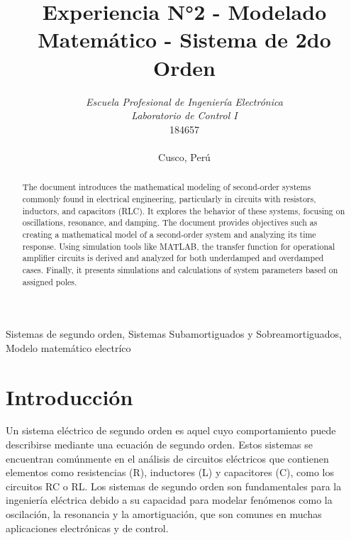 \documentclass[conference]{IEEEtran}
\begin{document}
	
	\title{Experiencia N°2 - Modelado Matemático - Sistema de 2do Orden}
	\author{	
		\textit{Escuela Profesional de Ingeniería Electrónica}\\
		\textit{Laboratorio de Control I}\\
		184657 \\\\
		Cusco, Perú
	}
	
	\maketitle
	
	\begin{abstract}
		The document introduces the mathematical modeling of second-order systems commonly found in electrical engineering, particularly in circuits with resistors, inductors, and capacitors (RLC). It explores the behavior of these systems, focusing on oscillations, resonance, and damping. The document provides objectives such as creating a mathematical model of a second-order system and analyzing its time response. Using simulation tools like MATLAB, the transfer function for operational amplifier circuits is derived and analyzed for both underdamped and overdamped cases. Finally, it presents simulations and calculations of system parameters based on assigned poles.
	\end{abstract}
	
	\begin{IEEEkeywords}
		Sistemas de segundo orden, Sistemas Subamortiguados y Sobreamortiguados, Modelo matemático electríco
	\end{IEEEkeywords}
	
	\section{Introducción}
	Un sistema eléctrico de segundo orden es aquel cuyo comportamiento puede describirse mediante una ecuación de segundo orden. Estos sistemas se encuentran comúnmente en el análisis de circuitos eléctricos que contienen elementos como resistencias (R), inductores (L) y capacitores (C), como los circuitos RC o RL. Los sistemas de segundo orden son fundamentales para la ingeniería eléctrica debido a su capacidad para modelar fenómenos como la oscilación, la resonancia y la amortiguación, que son comunes en muchas aplicaciones electrónicas y de control.
	
\end{document}
